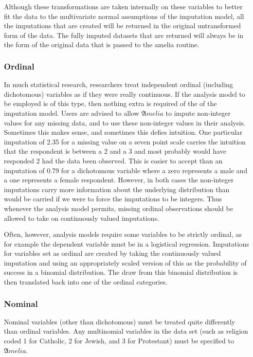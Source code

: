 \documentclass[12pt,titlepage]{article}
\begin{document}
Although these transformations are taken internally on these variables
to better fit the data to the multivariate normal assumptions of the
imputation model, all the imputations that are created will be
returned in the original untransformed form of the data.  The fully
imputed datasets that are returned will always be in the form of the
original data that is passed to the amelia routine.

\subsubsection{Ordinal}
\label{sec:ord}
In much statistical research, researchers treat independent ordinal
(including dichotomous) variables as if they were really continuous.
If the analysis model to be employed is of this type, then nothing
extra is required of the of the imputation model. Users are advised to
allow ${\mathfrak Amelia}$ to impute non-integer values for any
missing data, and to use these non-integer values in their analysis.
Sometimes this makes sense, and sometimes this defies intuition. One
particular imputation of 2.35 for a missing value on a seven point
scale carries the intuition that the respondent is between a 2 and a 3
and most probably would have responded 2 had the data been observed.
This is easier to accept than an imputation of 0.79 for a dichotomous
variable where a zero represents a male and a one represents a female
respondent. However, in both cases the non-integer imputations carry
more information about the underlying distribution than would be
carried if we were to force the imputations to be integers. Thus
whenever the analysis model permits, missing ordinal observations
should be allowed to take on continuously valued imputations.

Often, however, analysis models require some variables to be strictly
ordinal, as for example the dependent variable must be in a logistical
regression.  Imputations for variables set as ordinal are created by
taking the continuously valued imputation and using an appropriately
scaled version of this as the probability of success in a binomial
distribution. The draw from this binomial distribution is then
translated back into one of the ordinal categories.

\subsubsection{Nominal}
\label{sec:nom}
Nominal variables (other than dichotomous) must be treated quite
differently than ordinal variables. Any multinomial variables in the
data set (such as religion coded 1 for Catholic, 2 for Jewish, and 3
for Protestant) must be specified to ${\mathfrak Amelia}$.
\end{document}

